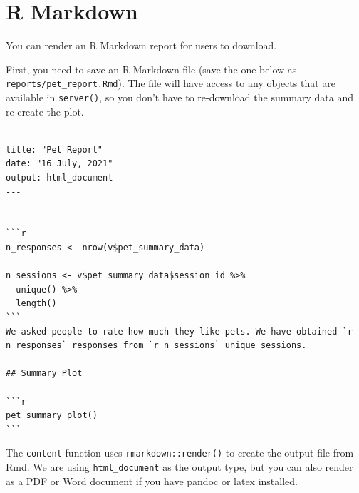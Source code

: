 \documentclass[
]{book}
\newenvironment{Shaded}{\begin{snugshade}}{\end{snugshade}}
\newcommand{\AttributeTok}[1]{\textcolor[rgb]{0.77,0.63,0.00}{#1}}
\newcommand{\ControlFlowTok}[1]{\textcolor[rgb]{0.13,0.29,0.53}{\textbf{#1}}}
\newcommand{\DocumentationTok}[1]{\textcolor[rgb]{0.56,0.35,0.01}{\textbf{\textit{#1}}}}
\newcommand{\FunctionTok}[1]{\textcolor[rgb]{0.00,0.00,0.00}{#1}}
\newcommand{\NormalTok}[1]{#1}
\newcommand{\OtherTok}[1]{\textcolor[rgb]{0.56,0.35,0.01}{#1}}
\newcommand{\SpecialCharTok}[1]{\textcolor[rgb]{0.00,0.00,0.00}{#1}}
\newcommand{\StringTok}[1]{\textcolor[rgb]{0.31,0.60,0.02}{#1}}
\begin{document}
\hypertarget{r-markdown}{%
\section{R Markdown}\label{r-markdown}}

You can render an R Markdown report for users to download.

First, you need to save an R Markdown file (save the one below as \texttt{reports/pet\_report.Rmd}). The file will have access to any objects that are available in \texttt{server()}, so you don't have to re-download the summary data and re-create the plot.

\begin{verbatim}
---
title: "Pet Report"
date: "16 July, 2021" 
output: html_document
---


```r
n_responses <- nrow(v$pet_summary_data)

n_sessions <- v$pet_summary_data$session_id %>%
  unique() %>%
  length()
```
We asked people to rate how much they like pets. We have obtained `r n_responses` responses from `r n_sessions` unique sessions.

## Summary Plot

```r
pet_summary_plot()
```
\end{verbatim}

The \texttt{content} function uses \texttt{rmarkdown::render()} to create the output file from Rmd. We are using \texttt{html\_document} as the output type, but you can also render as a PDF or Word document if you have pandoc or latex installed.

\begin{Shaded}
\end{Shaded}
\end{document}
